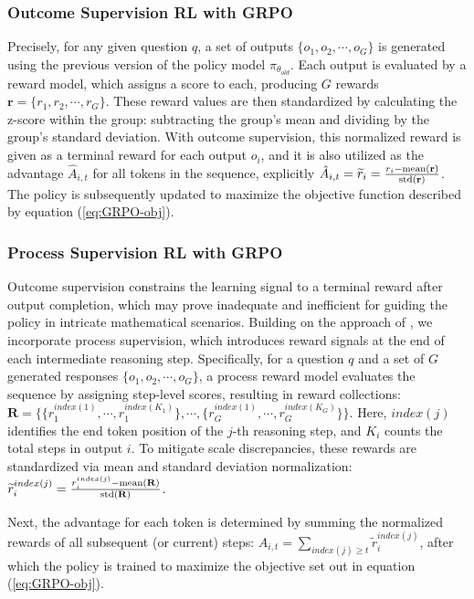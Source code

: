 \begin{itemize}[topsep=0pt]
\begin{itemize}[topsep=0pt]
\subsubsection{Outcome Supervision RL with GRPO} Precisely, for any given question $q$, a set of outputs $\{o_1, o_2, \cdots, o_G\}$ is generated using the previous version of the policy model $\pi_{\theta_{old}}$. Each output is evaluated by a reward model, which assigns a score to each, producing $G$ rewards $\mathbf{r}=\{r_1, r_2, \cdots, r_G\}$. These reward values are then standardized by calculating the z-score within the group: subtracting the group's mean and dividing by the group's standard deviation. With outcome supervision, this normalized reward is given as a terminal reward for each output $o_i$, and it is also utilized as the advantage $\hat{A}_{i, t}$ for all tokens in the sequence, explicitly $\hat{A}_{i, t} = \widetilde{r}_i = \frac{r_i- {\rm mean}(\mathbf{r})}{{\rm std}(\mathbf{r})}$. The policy is subsequently updated to maximize the objective function described by equation (\ref{eq:GRPO-obj}).

\subsubsection{Process Supervision RL with GRPO} Outcome supervision constrains the learning signal to a terminal reward after output completion, which may prove inadequate and inefficient for guiding the policy in intricate mathematical scenarios. Building on the approach of \cite{wang2023math}, we incorporate process supervision, which introduces reward signals at the end of each intermediate reasoning step. Specifically, for a question $q$ and a set of $G$ generated responses $\{o_1, o_2, \cdots, o_G\}$, a process reward model evaluates the sequence by assigning step-level scores, resulting in reward collections: $\mathbf{R} = \{ \{r_1^{index(1)},\cdots,r_1^{index(K_1)}\}, \cdots,  \{r_G^{index(1)},\cdots,r_G^{index(K_G)}\} \}$. Here, $index(j)$ identifies the end token position of the $j$-th reasoning step, and $K_i$ counts the total steps in output $i$. To mitigate scale discrepancies, these rewards are standardized via mean and standard deviation normalization: $\widetilde{r}_i^{index(j)} = \frac{r_i^{index(j)} - {\rm mean(\mathbf{R})}}{{\rm std(\mathbf{R})}}$.

Next, the advantage for each token is determined by summing the normalized rewards of all subsequent (or current) steps: $\hat{A}_{i, t} = \sum_{index(j) \ge t} \widetilde{r}_i^{index(j)}$,
after which the policy is trained to maximize the objective set out in equation (\ref{eq:GRPO-obj}).


\end{itemize}
\end{itemize}
